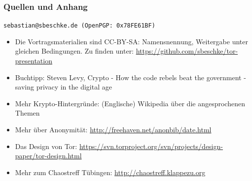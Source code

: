 \documentclass{beamer}
\begin{document}
\begin{frame}
\frametitle{Quellen und Anhang}

\texttt{sebastian@sbeschke.de (OpenPGP: 0x78FE61BF)}

\begin{itemize}
	\item Die Vortragsmaterialien sind CC-BY-SA: Namensnennung, Weitergabe unter gleichen Bedingungen. Zu finden unter: \url{https://github.com/sbeschke/tor-presentation}
	\item Buchtipp: Steven Levy, Crypto - How the code rebels beat the government - saving privacy in the digital age
	\item Mehr Krypto-Hintergründe: (Englische) Wikipedia über die angesprochenen Themen
	\item Mehr über Anonymität: \url{http://freehaven.net/anonbib/date.html}
	\item Das Design von Tor: \url{https://svn.torproject.org/svn/projects/design-paper/tor-design.html}
	\item Mehr zum Chaostreff Tübingen: \url{http://chaostreff.klappezu.org}
\end{itemize}

\end{frame}
\end{document}
